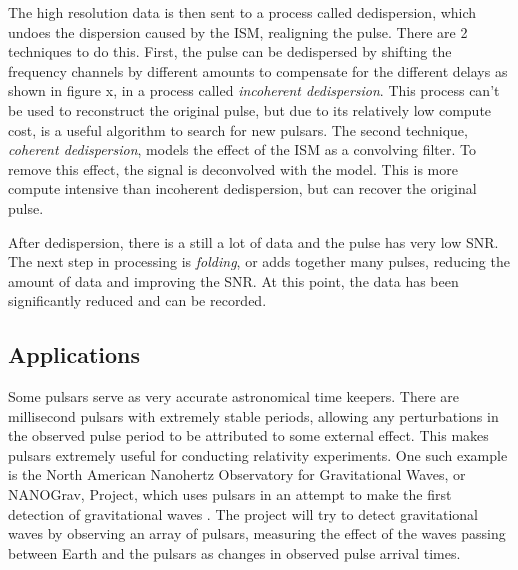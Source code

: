 The high resolution data is then sent to a process called dedispersion, which undoes the dispersion caused by the ISM, realigning the pulse.
There are 2 techniques to do this.
First, the pulse can be dedispersed by shifting the frequency channels by different amounts to compensate for the different delays as shown in figure x, in a process called \emph{incoherent dedispersion}. %
This process can't be used to reconstruct the original pulse, but due to its relatively low compute cost, is a useful algorithm to search for new pulsars.
The second technique, \emph{coherent dedispersion}, models the effect of the ISM as a convolving filter. 
To remove this effect, the signal is deconvolved with the model.
This is more compute intensive than incoherent dedispersion, but can recover the original pulse.

After dedispersion, there is a still a lot of data and the pulse has very low SNR. 
The next step in processing is \emph{folding}, or adds together many pulses, reducing the amount of data and improving the SNR.
At this point, the data has been significantly reduced and can be recorded. 



%
\subsection{Applications}
Some pulsars serve as very accurate astronomical time keepers.
There are millisecond pulsars with extremely stable periods, allowing any perturbations in the observed pulse period to be attributed to some external effect.
This makes pulsars extremely useful for conducting relativity experiments. 
One such example is the North American Nanohertz Observatory for Gravitational Waves, or NANOGrav, Project, %
which uses pulsars in an attempt to make the first detection of gravitational waves \cite{2009astro2010S..64D}. 
The project will try to detect gravitational waves by observing an array of pulsars, measuring the effect of the waves passing between Earth and the pulsars as changes in observed pulse arrival times.


